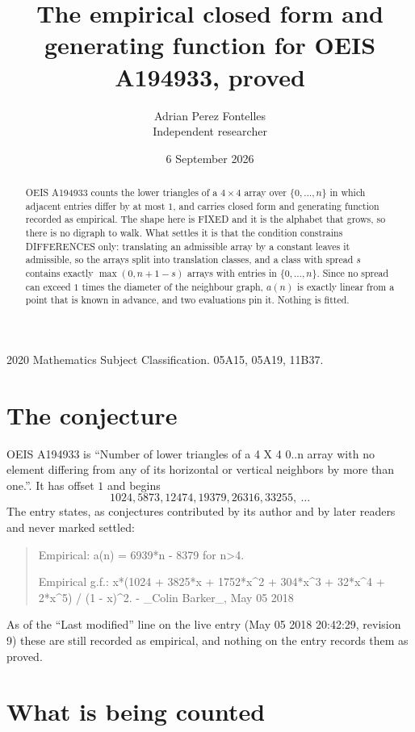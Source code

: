 \documentclass[11pt,a4paper]{article}
\title{The empirical closed form and generating function for OEIS A194933, proved}
\author{Adrian Perez Fontelles\\ \small Independent researcher}
\date{6 September 2026}
\theoremstyle{plain}
\theoremstyle{definition}
\begin{document}
\maketitle

\begin{abstract}
OEIS A194933 counts the lower triangles of a $4\times4$ array over $\{0,\dots,n\}$ in which
adjacent entries differ by at most $1$, and carries closed form and generating function recorded as empirical. The shape here is FIXED
and it is the alphabet that grows, so there is no digraph to walk. What settles it is that the
condition constrains DIFFERENCES only: translating an admissible array by a constant leaves it
admissible, so the arrays split into translation classes, and a class with spread $s$ contains
exactly $\max(0,n+1-s)$ arrays with entries in $\{0,\dots,n\}$. Since no spread can exceed
$1$ times the diameter of the neighbour graph, $a(n)$ is exactly linear from a point that is
known in advance, and two evaluations pin it. Nothing is fitted.
\end{abstract}

\noindent\small 2020 Mathematics Subject Classification. 05A15, 05A19, 11B37.\normalsize

\section{The conjecture}

OEIS A194933 is ``Number of lower triangles of a 4 X 4 0..n array with no element differing from any of its horizontal or vertical neighbors by more than one.''. It has offset $1$ and begins
\[
1024, 5873, 12474, 19379, 26316, 33255,\ \dots
\]
The entry states, as conjectures contributed by its author and by later readers and never
marked settled:
\begin{quote}
Empirical: a(n) = 6939*n - 8379 for n>4.

Empirical g.f.: x*(1024 + 3825*x + 1752*x\^{}2 + 304*x\^{}3 + 32*x\^{}4 + 2*x\^{}5) / (1 - x)\^{}2. - \_Colin Barker\_, May 05 2018
\end{quote}
As of the ``Last modified'' line on the live entry (May 05 2018 20:42:29, revision 9) these are still
recorded as empirical, and nothing on the entry records them as proved.

\section{What is being counted}
\end{document}
